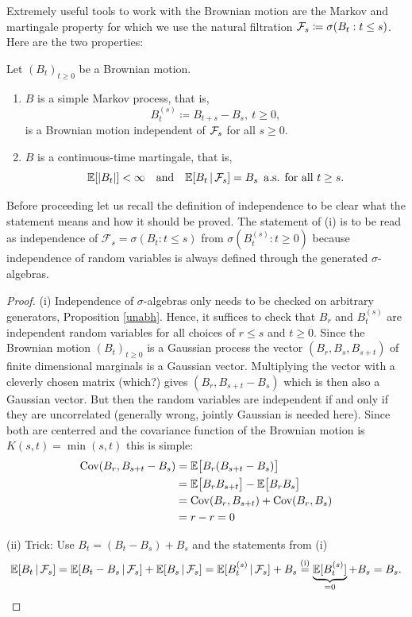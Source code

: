 Extremely useful tools to work with the Brownian motion are the Markov  and martingale property for which we use the natural filtration $\mathcal{F}_s \coloneqq \sigma(B_t : t\leq s)$. Here are the two properties:
\begin{llemma}
\begin{prop}
	Let $(B_t)_{t\geq 0}$ be a Brownian motion.
	\begin{enumerate}[label=(\roman*)]
		\item
			$B$ is a simple Markov process, that is,
			$$B_t^{(s)} \coloneqq B_{t+s} - B_s, \: t\geq 0,$$ is a Brownian motion independent of $\mathcal{F}_s$ for all $s\geq 0$.
		\item
			$B$ is a continuous-time martingale, that is,
			$$\mathbb{E}[\lvert B_t \rvert ]<\infty\quad \text{and}\quad \mathbb{E} [B_t\,|\,\mathcal{F}_s] = B_s\,\text{ a.s. for all }t\geq s.$$
	\end{enumerate}
\end{prop} 
\end{llemma}
Before proceeding let us recall the definition of independence to be clear what the statement means and how it should be proved. The statement of (i) is to be read as independence of $\mathcal F_s=\sigma(B_t: t\leq s)$ from $\sigma(B_t^{(s)}: t\geq 0)$ because independence of random variables is always defined through the generated $\sigma$-algebras. 
\begin{proof}[Proof]
(i) Independence of $\sigma$-algebras only needs to be checked on arbitrary generators, Proposition \ref{unabh}. Hence, it suffices to 
check that $B_{r}$ and $B_{t}^{(s)}$ are independent random variables for all choices of $r\leq s$ and $t\geq 0$. 
			Since the Brownian motion $(B_t)_{t\geq 0}$ is a Gaussian process the vector 
			$(B_r,B_s,B_{s+t})$ of finite dimensional marginals is a Gaussian vector. Multiplying the vector with a cleverly chosen matrix (which?) gives $(B_{r},B_{s+t}-B_s)$ which is then also a Gaussian vector.
			But then the random variables are independent if and only if they are uncorrelated (generally wrong, jointly Gaussian is needed here).
			 Since both are centerred and the covariance function of the Brownian motion is $K(s,t)=\min(s,t)$ this is simple:
			\begin{align*}
				\text{Cov}(B_{r},B_{s+t}-B_s) &= \mathbb{E} \big[ B_{r}(B_{s+t}-B_s)\big] \\
												&= \mathbb{E} \big[B_{r}B_{s+t}\big] - \mathbb{E} \big[B_{r}B_s\big]\\
												&=\text{Cov}(B_{r},B_{s+t})+\text{Cov}(B_{r},B_s)\\
												&= r - r = 0
			\end{align*}
			
	(ii)
			Trick: Use $B_t = (B_t-B_s)+B_s$ and the statements from (i)
			\begin{align*}
				\mathbb{E} [B_t \,|\,\mathcal{F}_s] = \mathbb{E} [B_t - B_s\,|\,\mathcal{F}_s] + \mathbb{E}[B_s\,|\,\mathcal{F}_s] 
										= \mathbb{E} [B_t^{(s)}\,|\,\mathcal{F}_s] + B_s 
										\overset{\text{(i)}}{=} \underbrace{\mathbb{E}[B_t^{(s)}]}_{=0} + B_s=B_s.
			\end{align*}
\end{proof}
